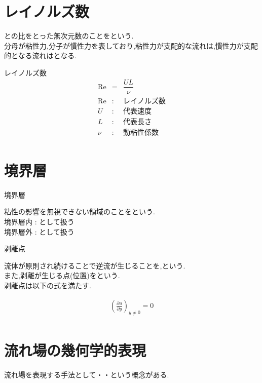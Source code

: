\documentclass[a4paper]{jsarticle}
\begin{document}
\section{レイノルズ数}
との比をとった無次元数のことをという.\\
分母が粘性力,分子が慣性力を表しており,粘性力が支配的な流れは,慣性力が支配的となる流れはとなる.\\
\begin{itembox}[l]{レイノルズ数}
    \begin{eqnarray*}
        \mathrm{Re}&=&\dfrac{UL}{\nu}\\
        \mathrm{Re} &:& レイノルズ数\\
        U &:& 代表速度\\
        L &:& 代表長さ\\
        \nu &:& 動粘性係数\\
    \end{eqnarray*}
\end{itembox}
\section{境界層}
\begin{itembox}[l]{境界層}
    \begin{center}
        粘性の影響を無視できない領域のことをという.\\
        境界層内 : として扱う  \\
        境界層外 : として扱う
    \end{center}
\end{itembox}
\begin{itembox}[l]{剥離点}
    \begin{center}
        流体が原則され続けることで逆流が生じることを,という.\\
        また,剥離が生じる点(位置)をという.\\
        剥離点は以下の式を満たす.
    \end{center}
    \begin{eqnarray*}
        \left(\frac{\partial u}{\partial y}\right)_{y\neq 0}=0\\
    \end{eqnarray*}
\end{itembox}
\section{流れ場の幾何学的表現}
流れ場を表現する手法として・・という概念がある.\\
\end{document}
